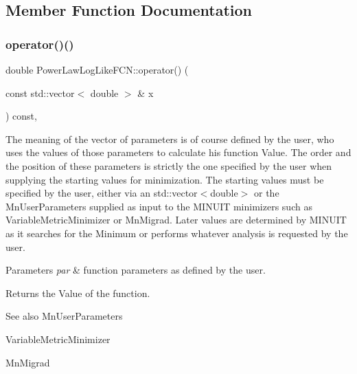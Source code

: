 \subsection{Member Function Documentation}
\mbox{\label{classPowerLawLogLikeFCN_a279b7010b6b252d0772e5d561f749386}} 
\subsubsection{\texorpdfstring{operator()()}{operator()()}\hspace{0.1cm}{\footnotesize\ttfamily [1/2]}}
{\footnotesize\ttfamily double Power\+Law\+Log\+Like\+F\+C\+N\+::operator() (\begin{DoxyParamCaption}\item[{const std\+::vector$<$ double $>$ \&}]{x }\end{DoxyParamCaption}) const\hspace{0.3cm}{\ttfamily [inline]}, {\ttfamily [virtual]}}

The meaning of the vector of parameters is of course defined by the user, who uses the values of those parameters to calculate his function Value. The order and the position of these parameters is strictly the one specified by the user when supplying the starting values for minimization. The starting values must be specified by the user, either via an std\+::vector$<$double$>$ or the Mn\+User\+Parameters supplied as input to the M\+I\+N\+U\+IT minimizers such as Variable\+Metric\+Minimizer or Mn\+Migrad. Later values are determined by M\+I\+N\+U\+IT as it searches for the Minimum or performs whatever analysis is requested by the user.


\begin{DoxyParams}{Parameters}
{\em par} & function parameters as defined by the user.\\
\hline
\end{DoxyParams}
\begin{DoxyReturn}{Returns}
the Value of the function.
\end{DoxyReturn}
\begin{DoxySeeAlso}{See also}
Mn\+User\+Parameters 

Variable\+Metric\+Minimizer 

Mn\+Migrad 
\end{DoxySeeAlso}



